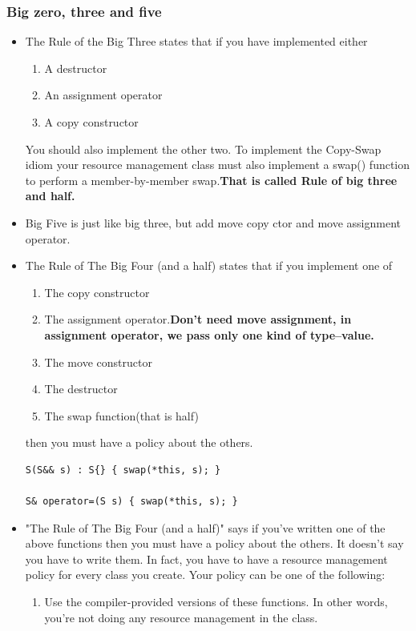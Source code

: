 \documentclass[a4paper,11pt,twoside]{book}
\begin{document}
\subsubsection{Big zero, three and five}
\begin{itemize}
	\item The Rule of the Big Three states that if you have implemented either
	\begin{enumerate}
		\item A destructor
		\item An assignment operator
		\item A copy constructor
	\end{enumerate}
	You should also implement the other two. To implement the Copy-Swap idiom your resource management class must also implement a swap() function to perform a member-by-member swap.\textbf{That is called Rule of big three and half.}
	
	\item Big Five is just like big three, but add move copy ctor and move assignment operator.
	
	\item The Rule of The Big Four (and a half) states that if you implement one of
	\begin{enumerate}
		\item The copy constructor
		\item The assignment operator.\textbf{Don't need move assignment, in assignment operator, we pass only one kind of type--value.} 
		\item The move constructor
		\item The destructor
		\item The swap function(that is half)
	\end{enumerate}
	then you must have a policy about the others.
\begin{lstlisting}[numbers=none]
S(S&& s) : S{} { swap(*this, s); }

S& operator=(S s) { swap(*this, s); }
\end{lstlisting}

	\item "The Rule of The Big Four (and a half)" says if you've written one of the above functions then you must have a policy about the others. It doesn't say you have to write them. In fact, you have to have a resource management policy for every class you create. Your policy can be one of the following:
	\begin{enumerate}
		\item Use the compiler-provided versions of these functions. In other words, you're not doing any resource management in the class.
		

\end{enumerate}
\end{itemize}
\end{document}
